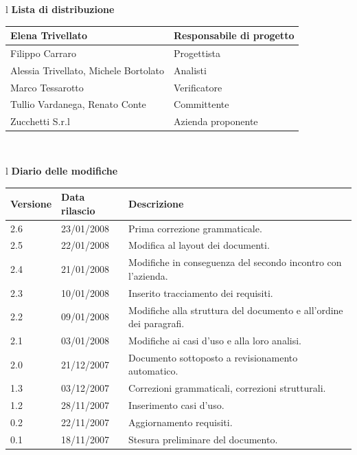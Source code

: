 \documentclass[11pt,titlepage,a4paper]{report}
\begin{document}
\begin{center}
\begin{table}[hbtp]
\large{
\begin{tabular}{l}
\Large{\textbf{\textsf{Lista di distribuzione}}} \\
\begin{tabular}{||p{6cm}||p{6cm}||} \hline
{Elena Trivellato}& Responsabile di progetto \\ \hline 
{Filippo Carraro}& Progettista \\ \hline
{Alessia Trivellato, Michele Bortolato}& Analisti \\ \hline
{Marco Tessarotto}& Verificatore \\ \hline
{Tullio Vardanega, Renato Conte}& Committente \\ \hline 
{Zucchetti S.r.l}& Azienda proponente\\ \hline
\end{tabular} \\
\end{tabular}
}
\end{table}
\begin{table}[hbtp]
\large{
\begin{tabular}{l}
\Large{\textbf{\textsf{Diario delle modifiche}}} \\
\begin{tabular}{||p{2cm}||p{3.5cm}||p{6cm}||} \hline
\textbf{Versione} & \textbf{Data rilascio} & \textbf{Descrizione} \\ \hline
2.6 & 23/01/2008 & Prima correzione grammaticale.\\ \hline
2.5 & 22/01/2008 & Modifica al layout dei documenti.\\ \hline
2.4 & 21/01/2008 & Modifiche in conseguenza del secondo incontro con l'azienda.\\ \hline
2.3 & 10/01/2008 & Inserito tracciamento dei requisiti.\\ \hline
2.2 & 09/01/2008 & Modifiche alla struttura del documento e all'ordine dei paragrafi.\\ \hline
2.1 & 03/01/2008 & Modifiche ai casi d'uso e alla loro analisi.\\ \hline
2.0 & 21/12/2007 & Documento sottoposto a revisionamento automatico.\\ \hline
1.3 & 03/12/2007 & Correzioni grammaticali, correzioni strutturali.\\ \hline
1.2 & 28/11/2007 & Inserimento casi d'uso.\\ \hline
0.2 & 22/11/2007 & Aggiornamento requisiti. \\ \hline
0.1 & 18/11/2007 & Stesura preliminare del documento. \\ \hline

\end{tabular} \\
\end{tabular}

}
\end{table}
\end{center}
\newpage
\end{document}
